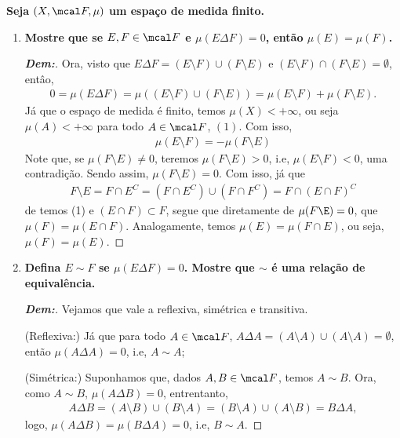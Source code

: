 \newpage 
{}
\myexe{\thedois}
\bigline 
\textbf{Seja $(X, \mcal F, \mu)$ um espaço de medida finito.} 
\begin{enumerate}[label=(\alph*), wide, labelindent=0pt]
  \item \textbf{Mostre que se $E, F \in \mcal F$ e $\mu(E \Delta F) = 0$, 
    então $\mu(E) = \mu(F)$.}
    \begin{proof}[\textbf{Dem:}] Ora, visto que 
      $E \Delta F = (E \setminus F) \cup (F \setminus E)$ e 
      $(E\setminus F)\cap (F \setminus E) = \emptyset$, entâo, 
      \begin{align*}
        0 = \mu(E\Delta F) = \mu((E \setminus F) \cup (F \setminus E))
        = \mu(E\setminus F) + \mu(F\setminus E).
      \end{align*}
      Já que o espaço de medida é finito, temos $\mu(X)<+\infty$, ou seja $\mu(A) < +\infty$
      para todo $A \in \mcal F$, $(1)$. Com isso, 
      \begin{align*}
        \mu(E\setminus F) = -\mu(F\setminus E)
      \end{align*}
      Note que, se $\mu(F\setminus E) \neq 0$, teremos $\mu(F \setminus E) > 0$, i.e, 
      $\mu(E \setminus F) < 0$, uma contradição. Sendo assim, $\mu(F \setminus E) = 0$. 
      Com isso, já que 
      \begin{align*}
        F\setminus E = F \cap E^C = (F \cap E^C) \cup (F \cap F^C) = F\cap(E \cap F)^C
      \end{align*}
      de temos (1) e $(E\cap F) \subset F$, segue que diretamente de $\mu(F\E) = 0$,
      que $\mu(F) = \mu(E \cap F)$. Analogamente, temos $\mu(E) = \mu(F \cap E)$, 
      ou seja, $\mu(F) = \mu(E)$.
  \end{proof}
  \item \textbf{Defina $E\sim F$ se $\mu(E \Delta F) = 0$. Mostre que $\sim$ é uma 
    relação de equivalência.}
    \begin{proof}[\textbf{Dem:}]
      Vejamos que vale a reflexiva, simétrica e transitiva. 
     
      \noindent
      (Reflexiva:) Já que para todo $A \in \mcal F$, $A \Delta A = (A\setminus A) \cup (A \setminus A) = \emptyset$, 
      então $\mu(A\Delta A) = 0$, i.e, $A \sim A$;
      
      \noindent 
      (Simétrica:) Suponhamos que, dados $A, B \in \mcal F$, temos $A \sim B$. Ora, como $A \sim B$, 
      $\mu(A\Delta B) = 0$, entrentanto,
      \begin{align*}
        A\Delta B = (A\setminus B) \cup (B \setminus A) = (B \setminus A) \cup (A \setminus B) = B\Delta A,
      \end{align*}
      logo, $\mu(A\Delta B) = \mu(B\Delta A) = 0$, i.e, $B \sim A$.


\end{proof}
\end{enumerate}
